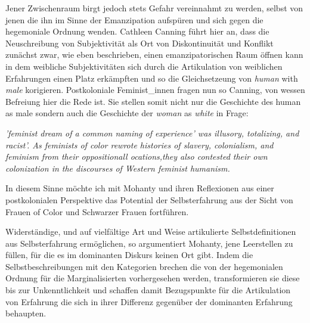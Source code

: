 Jener Zwischenraum birgt jedoch stets Gefahr vereinnahmt zu werden, selbst von
jenen die ihn im Sinne der Emanzipation aufspüren und sich gegen die
hegemoniale Ordnung wenden. Cathleen Canning \footnotemark {} führt hier an, dass die
Neuschreibung von Subjektivität als Ort von Diskontinuität und Konflikt
zunächst zwar, wie eben beschrieben, einen emanzipatorischen Raum öffnen kann
in dem weibliche Subjektivitäten sich durch die Artikulation von weiblichen
Erfahrungen einen Platz erkämpften und so die Gleichsetzeung von \textit{human} with
\textit{male} korigieren. Postkoloniale Feminist\_innen fragen nun so Canning,
von wessen Befreiung hier die Rede ist. Sie stellen somit nicht nur die
Geschichte des human as male sondern auch die Geschichte der \textit{woman} as
\textit{white} in
Frage:
\begin{myenv}
 \textit{
 \glqq[...]'feminist dream of a common naming of experience' was illusory,
 totalizing, and racist'. As feminists of color rewrote histories of slavery,
 colonialism, and feminism from their oppositionall ocations,they also
 contested their own colonization in the discourses of Western feminist
 humanism. \grqq \footnotemark {}
 }
\end{myenv}

In diesem Sinne möchte ich mit Mohanty und ihren Reflexionen aus einer
postkolonialen Perspektive das Potential der Selbsterfahrung aus der Sicht von
Frauen of Color und Schwarzer Frauen fortführen.

Widerständige, und auf vielfältige Art und Weise artikulierte
Selbstdefinitionen aus Selbsterfahrung ermöglichen, so argumentiert Mohanty,
jene Leerstellen zu füllen, für die es im dominanten Diskurs keinen Ort gibt.
Indem die Selbstbeschreibungen mit den Kategorien brechen die von der
hegemonialen Ordnung für die Marginalisierten vorhergesehen werden,
transformieren sie diese bis zur Unkenntlichkeit und schaffen damit
Bezugspunkte für die Artikulation von Erfahrung die sich in ihrer Differenz
gegenüber der dominanten Erfahrung behaupten. \footnotemark
{}


